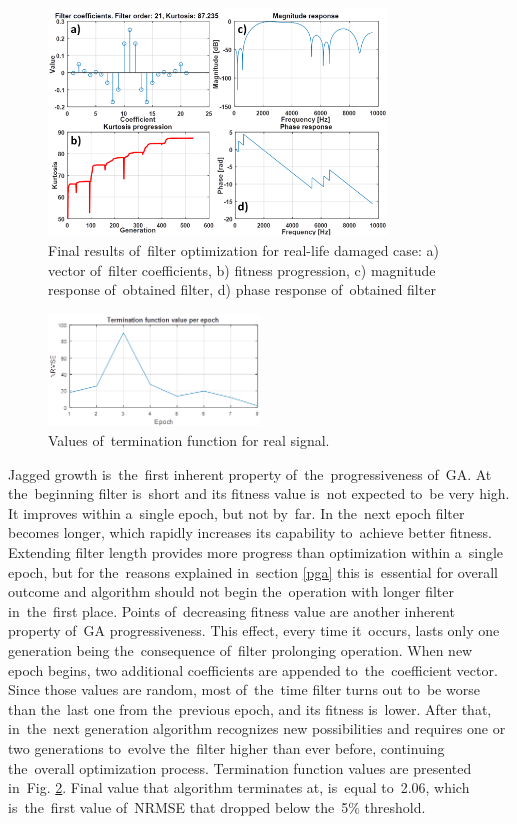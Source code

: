 \begin{figure}[ht!]
\centering
\includegraphics[width=0.8\textwidth]{wykresy/pga_real2.png}
\caption{Final results of~filter optimization for real-life damaged case: a) vector of~filter coefficients, b) fitness progression, c) magnitude response of~obtained filter, d) phase response of~obtained filter}
\label{fig:pga_real2}
\end{figure}


\begin{figure}[ht!]
\centering
\includegraphics[width=0.5\textwidth]{wykresy/pga_real3.png}
\caption{Values of~termination function for real signal.}
\label{fig:pga_real3}
\end{figure}

Jagged growth is~the~first inherent property of~the~progressiveness of~GA. At the~beginning filter is~short and its fitness value is~not expected to~be very high. It improves within a~single epoch, but not by~far. In the~next epoch filter becomes longer, which rapidly increases its capability to~achieve better fitness. Extending filter length provides more progress than optimization within a~single epoch, but for the~reasons explained in~section \ref{pga} this is~essential for overall outcome and algorithm should not begin the~operation with longer filter in~the~first place. Points of~decreasing fitness value are another inherent property of~GA progressiveness. This effect, every time it~occurs, lasts only one generation being the~consequence of~filter prolonging operation. When new epoch begins, two additional coefficients are appended to~the~coefficient vector. Since those values are random, most of~the~time filter turns out to~be worse than the~last one from the~previous epoch, and its fitness is~lower. After that, in~the~next generation algorithm recognizes new possibilities and requires one or two generations to~evolve the~filter higher than ever before, continuing the~overall optimization process. Termination function values are presented in~Fig. \ref{fig:pga_real3}. Final value that algorithm terminates at, is~equal to~2.06, which is~the~first value of~NRMSE that dropped below the~5$\%$ threshold.

